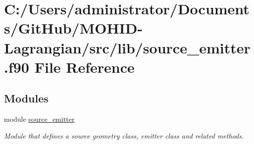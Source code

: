 \hypertarget{source__emitter_8f90}{}\section{C\+:/\+Users/administrator/\+Documents/\+Git\+Hub/\+M\+O\+H\+I\+D-\/\+Lagrangian/src/lib/source\+\_\+emitter.f90 File Reference}
\label{source__emitter_8f90}
\subsection*{Modules}
\begin{DoxyCompactItemize}
\item 
module \mbox{\hyperlink{namespacesource__emitter}{source\+\_\+emitter}}
\begin{DoxyCompactList}\small\item\em Module that defines a source geometry class, emitter class and related methods. \end{DoxyCompactList}\end{DoxyCompactItemize}
